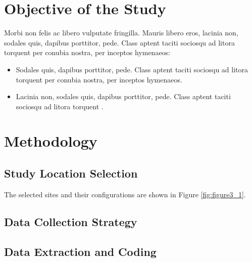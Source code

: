 
\section{Objective of the Study}
 Morbi non felis ac libero vulputate fringilla. Mauris
libero eros, lacinia non, sodales quis, dapibus porttitor, pede. Class aptent taciti sociosqu ad litora torquent per conubia nostra, per inceptos hymenaeos:

\begin{itemize}

  \item Sodales quis, dapibus porttitor, pede. Class aptent taciti sociosqu ad litora torquent per conubia nostra, per inceptos hymenaeos.
  
  \item Lacinia non, sodales quis, dapibus porttitor, pede. Class aptent taciti sociosqu ad litora torquent .
  
\end{itemize}



\section{Methodology}
\lipsum[33]



\subsection{Study Location Selection}
\lipsum[14] The selected sites and their configurations are shown in Figure \ref{fig:figure3_1}.




\subsection{Data Collection Strategy}
\lipsum[4-5]


\subsection{Data Extraction and Coding}
\lipsum[8]

